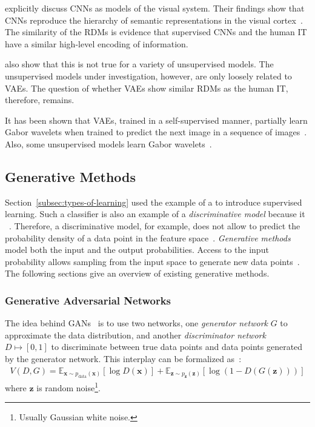 \citet{eickenberg2017seeing} explicitly discuss \acp{CNN} as models of the visual system.
Their findings show that \acp{CNN} reproduce the hierarchy of semantic representations in the visual cortex~\citep{eickenberg2017seeing, wen2018neural}.
The similarity of the \acp{RDM} is evidence that supervised \acp{CNN} and the human \ac{IT} have a similar high-level encoding of information.

\citet{khaligh2014deep} also show that this is not true for a variety of unsupervised models.
The unsupervised models under investigation, however, are only loosely related to \acfp{VAE}.
The question of whether \acp{VAE} show similar \acp{RDM} as the human \ac{IT}, therefore, remains.

It has been shown that \acp{VAE}, trained in a self-supervised manner, partially learn Gabor wavelets when trained to predict the next image in a sequence of images~\citep{palm2012prediction}.
Also, some unsupervised models learn Gabor wavelets~\citep{berkes2005slow}.

\subsection{Generative Methods}\label{subsec:generative-methods}

Section~\ref{subsec:types-of-learning} used the example of a  to introduce supervised learning.
Such a classifier is also an example of a \textit{discriminative model} because it ~\citep[p. 43]{bishop2006pattern}.
Therefore, a discriminative model, for example, does not allow to predict the probability density of a data point in the feature space~\citep[pp. 43,44]{bishop2006pattern}.
\textit{Generative methods} model both the input and the output probabilities.
Access to the input probability allows sampling from the input space to generate new data points~\citep[p. 43]{bishop2006pattern}.
The following sections give an overview of existing generative methods.

\subsubsection{Generative Adversarial Networks}\label{subsubsec:gans}

The idea behind \acp{GAN}~\citep{goodfellow2014gans} is to use two networks, one \textit{generator network} $G$ to approximate the data distribution, and another \textit{discriminator network} $D \mapsto [0, 1]$ to discriminate between true data points and data points generated by the generator network.
This interplay can be formalized as~\citep{goodfellow2014gans}:
\begin{align}
    V(D, G)=\mathbb{E}_{\bm{x} \sim p_{\text{data}}(\bm{x})}[\log D(\bm{x})]+\mathbb{E}_{\bm{z} \sim p_{\bm{z}}(\bm{z})}[\log (1-D(G(\bm{z})))]
\end{align}
where $\bm{z}$ is random noise\footnote{Usually Gaussian white noise.}.


